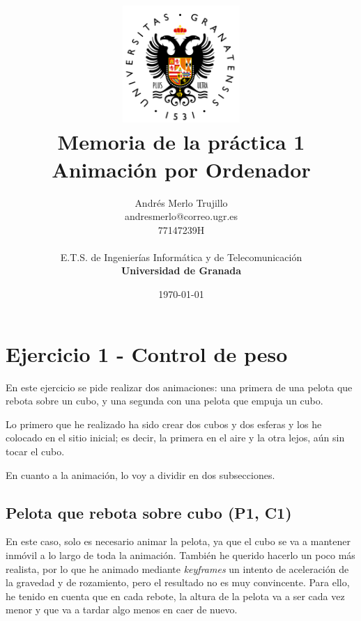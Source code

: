 \documentclass{article}
\title{
\includegraphics[width=1.75in]{imagenes/UGR-Logo.png} \\
\vspace*{1in}
\textbf{Memoria de la práctica 1} \\
Animación por Ordenador \\
\vspace*{0.5in}}
\author{Andrés Merlo Trujillo \\
andresmerlo@correo.ugr.es \\
77147239H \\ 
\vspace*{0.5in} \\
E.T.S. de Ingenierías Informática y de Telecomunicación \\
\textbf{Universidad de Granada}} \date{\today}
\begin{document}
\begin{titlingpage}
\maketitle
\end{titlingpage}

\tableofcontents

\newpage

\pagestyle{fancy}   %

\section{Ejercicio 1 - Control de peso}

En este ejercicio se pide realizar dos animaciones: una primera de una pelota que rebota sobre un cubo, y una segunda con una pelota que empuja un cubo.

\bigskip


Lo primero que he realizado ha sido crear dos cubos y dos esferas y los he colocado en el sitio inicial; es decir, la primera en el aire y la otra lejos, aún sin tocar el cubo.

\bigskip

En cuanto a la animación, lo voy a dividir en dos subsecciones.

\subsection{Pelota que rebota sobre cubo (P1, C1)}

En este caso, solo es necesario animar la pelota, ya que el cubo se va a mantener inmóvil a lo largo de toda la animación. También he querido hacerlo un poco más realista, por lo que he animado mediante \textit{keyframes} un intento de aceleración de la gravedad y de rozamiento, pero el resultado no es muy convincente. Para ello, he tenido en cuenta que en cada rebote, la altura de la pelota va a ser cada vez menor y que va a tardar algo menos en caer de nuevo. 
\end{document}
